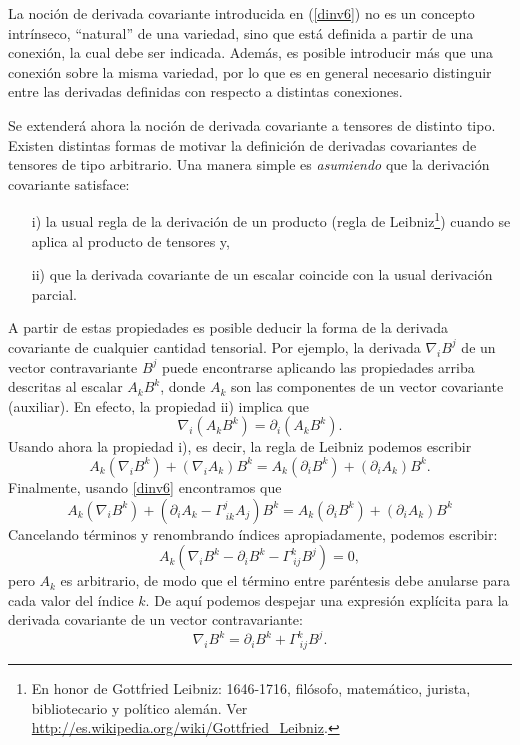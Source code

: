  La noción de derivada covariante introducida en (\ref{dinv6}) no es un concepto intrínseco, ``natural'' de una variedad, sino que está definida a partir de una conexión, la cual debe ser indicada. Además, es posible introducir más que una conexión sobre la misma variedad, por lo que es en general necesario distinguir entre las derivadas definidas con respecto a distintas conexiones.

Se extenderá ahora la noción de derivada covariante a tensores de distinto tipo. Existen distintas formas de motivar la definición de derivadas covariantes de tensores de tipo arbitrario. Una manera simple es  \textit{asumiendo} que la derivación covariante satisface:
\begin{itemize}
\item[i)] la usual regla de la derivación de un producto (regla de
Leibniz\footnote{En honor de Gottfried Leibniz: 1646-1716, filósofo, matemático, jurista, bibliotecario y político alemán. Ver \url{http://es.wikipedia.org/wiki/Gottfried_Leibniz}.}) cuando se aplica al producto de tensores y,
\item[ii)] que la derivada covariante de un escalar coincide con la usual derivación parcial.
\end{itemize}

A partir de estas propiedades es posible deducir la forma de la derivada covariante de cualquier cantidad tensorial. Por ejemplo, la derivada $\nabla_iB^j$ de un vector contravariante $B^j$ puede encontrarse aplicando las propiedades arriba descritas al escalar $A_k B^k $, donde $A_k$ son las componentes de un vector covariante (auxiliar). En efecto, la propiedad ii) implica que
\begin{equation}
\nabla_i\left( A_k B^k\right)=\partial_i\left( A_k B^k \right).\label{dinv12}
\end{equation}
Usando ahora la propiedad i), es decir, la regla de Leibniz podemos escribir
\begin{equation}
A_k (\nabla_iB^k)+(\nabla_i A_k)B^k = A_k (\partial_iB^k) +(\partial_iA_k)B^k .
\end{equation}
Finalmente, usando \eqref{dinv6} encontramos que
\begin{equation}
A_k (\nabla_iB^k) +\left(\partial_iA_k-\Gamma_{\ ik}^jA_j\right) B^k=A_k (\partial_iB^k) +(\partial_iA_k)B^k 
\end{equation}
Cancelando términos y renombrando índices apropiadamente, podemos
escribir:
\begin{equation}
A_k \left( \nabla_iB^k -\partial_iB^k -\Gamma_{\ ij}^k B^j\right) =0,
\end{equation}
pero $A_k $ es arbitrario, de modo que el término entre paréntesis debe anularse para cada valor del índice $k$. De aquí podemos despejar una expresión explícita para la derivada covariante de un vector contravariante:
\begin{equation}
\boxed{\nabla_iB^k =\partial_iB^k +\Gamma_{\ ij}^kB^j .} \label{dinv15}
\end{equation}

